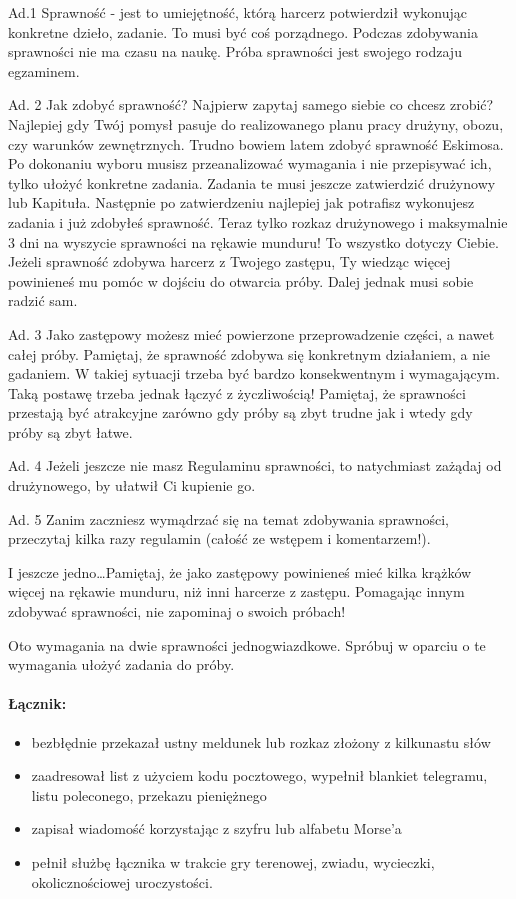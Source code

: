 Ad.1
Sprawność - jest to umiejętność, którą harcerz potwierdził  wykonując konkretne dzieło, zadanie. To musi  być  coś  porządnego. Podczas zdobywania sprawności nie ma czasu na naukę. Próba  sprawności jest swojego rodzaju egzaminem.

Ad. 2
Jak  zdobyć sprawność? Najpierw zapytaj samego siebie co chcesz zrobić? Najlepiej gdy Twój pomysł pasuje do realizowanego planu pracy drużyny, obozu, czy warunków  zewnętrznych. Trudno bowiem latem zdobyć sprawność Eskimosa. Po dokonaniu wyboru musisz  przeanalizować wymagania i nie przepisywać ich, tylko ułożyć konkretne zadania. Zadania te musi jeszcze zatwierdzić drużynowy lub Kapituła. Następnie  po  zatwierdzeniu najlepiej jak potrafisz wykonujesz zadania i już zdobyłeś sprawność. Teraz tylko rozkaz drużynowego i maksymalnie 3 dni na wyszycie sprawności na rękawie munduru! To  wszystko dotyczy Ciebie. Jeżeli sprawność zdobywa harcerz z Twojego zastępu, Ty  wiedząc więcej powinieneś mu  pomóc w dojściu do otwarcia próby. Dalej jednak musi sobie radzić sam.

Ad. 3
Jako zastępowy możesz mieć powierzone  przeprowadzenie części, a nawet całej  próby. Pamiętaj, że sprawność zdobywa się konkretnym działaniem, a nie gadaniem. W takiej sytuacji trzeba być bardzo konsekwentnym i wymagającym. Taką postawę trzeba  jednak łączyć  z  życzliwością! Pamiętaj, że sprawności przestają być atrakcyjne zarówno gdy próby  są zbyt trudne  jak  i  wtedy gdy próby  są  zbyt  łatwe.

Ad. 4
Jeżeli jeszcze nie masz Regulaminu sprawności, to natychmiast zażądaj od drużynowego, by ułatwił Ci kupienie go.

Ad. 5
Zanim zaczniesz wymądrzać się na temat zdobywania sprawności, przeczytaj kilka razy regulamin (całość ze wstępem i komentarzem!).

I jeszcze jedno\ldots Pamiętaj, że jako zastępowy powinieneś mieć kilka krążków więcej na rękawie munduru, niż inni harcerze z zastępu. Pomagając innym zdobywać sprawności, nie zapominaj o swoich próbach!

Oto wymagania na dwie sprawności  jednogwiazdkowe. Spróbuj w oparciu o te wymagania ułożyć zadania do próby.
\paragraph{Łącznik:}	\begin{itemize}[noitemsep,nolistsep] 
\item  bezbłędnie  przekazał ustny meldunek lub rozkaz złożony z kilkunastu słów
 \item zaadresował  list z użyciem kodu pocztowego, wypełnił blankiet telegramu, listu  poleconego, przekazu pieniężnego
\item  zapisał wiadomość korzystając z szyfru lub alfabetu Morse’a
\item  pełnił służbę łącznika w trakcie gry terenowej, zwiadu, wycieczki, okolicznościowej uroczystości.
\end{itemize}
